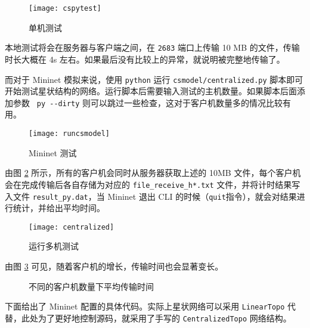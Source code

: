 \begin{figure}[H]
    \centering
    \texttt{[image: cspytest]}
    \caption{单机测试}
\end{figure}

本地测试将会在服务器与客户端之间，在 \verb"2683" 端口上传输 10 MB 的文件，传输时长大概在 4s 左右。如果最后没有比较上的异常，就说明被完整地传输了。


而对于 Mininet 模拟来说，使用 \verb"python" 运行 \verb"csmodel/centralized.py" 脚本即可开始测试星状结构的网络。运行脚本后需要输入测试的主机数量。如果脚本后面添加参数 \verb" py --dirty" 则可以跳过一些检查，这对于客户机数量多的情况比较有用。

\begin{figure}[H]
    \centering
    \texttt{[image: runcsmodel]}
    \caption{Mininet 测试}\label{fig:csmodelrun}
\end{figure}

由图 \ref{fig:csmodeltest} 所示，所有的客户机会同时从服务器获取上述的 10MB 文件，每个客户机会在完成传输后各自存储为对应的 \verb"file_receive_h*.txt" 文件，并将计时结果写入文件 \verb"result_py.dat"，当 Mininet 退出 CLI 的时候（\verb"quit"指令），就会对结果进行统计，并给出平均时间。

\begin{figure}[H]
    \centering
    \texttt{[image: centralized]}
    \caption{运行多机测试}\label{fig:csmodeltest}
\end{figure}

由图 \ref{fig:csmodelstat} 可见，随着客户机的增长，传输时间也会显著变长。

\begin{figure}[H]
    \centering
    \caption{不同的客户机数量下平均传输时间}\label{fig:csmodelstat}
\end{figure}    

下面给出了 Mininet 配置的具体代码。实际上星状网络可以采用 \verb"LinearTopo" 代替，此处为了更好地控制源码，就采用了手写的 \verb"CentralizedTopo" 网络结构。

